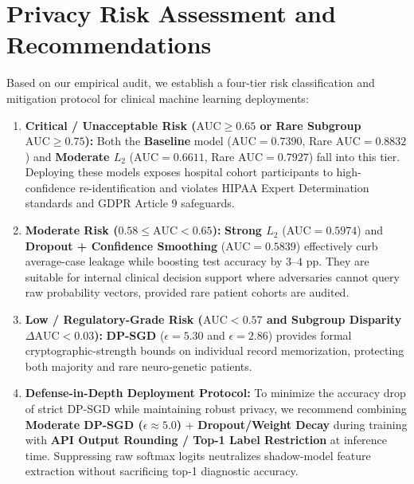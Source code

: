 \documentclass[10pt,twocolumn]{article}
\begin{document}
\section{Privacy Risk Assessment and Recommendations}
Based on our empirical audit, we establish a four-tier risk classification and mitigation protocol for clinical machine learning deployments:
\begin{enumerate}
    \item \textbf{Critical / Unacceptable Risk ($\text{AUC} \ge 0.65$ or Rare Subgroup $\text{AUC} \ge 0.75$):} Both the \textbf{Baseline} model ($\text{AUC}=0.7390$, Rare $\text{AUC}=0.8832$) and \textbf{Moderate $L_2$} ($\text{AUC}=0.6611$, Rare $\text{AUC}=0.7927$) fall into this tier. Deploying these models exposes hospital cohort participants to high-confidence re-identification and violates HIPAA Expert Determination standards and GDPR Article 9 safeguards.
    \item \textbf{Moderate Risk ($0.58 \le \text{AUC} < 0.65$):} \textbf{Strong $L_2$} ($\text{AUC}=0.5974$) and \textbf{Dropout + Confidence Smoothing} ($\text{AUC}=0.5839$) effectively curb average-case leakage while boosting test accuracy by $3$--$4$ pp. They are suitable for internal clinical decision support where adversaries cannot query raw probability vectors, provided rare patient cohorts are audited.
    \item \textbf{Low / Regulatory-Grade Risk ($\text{AUC} < 0.57$ and Subgroup Disparity $\Delta\text{AUC} < 0.03$):} \textbf{DP-SGD} ($\epsilon=5.30$ and $\epsilon=2.86$) provides formal cryptographic-strength bounds on individual record memorization, protecting both majority and rare neuro-genetic patients.
    \item \textbf{Defense-in-Depth Deployment Protocol:} To minimize the accuracy drop of strict DP-SGD while maintaining robust privacy, we recommend combining \textbf{Moderate DP-SGD ($\epsilon \approx 5.0$)} + \textbf{Dropout/Weight Decay} during training with \textbf{API Output Rounding / Top-1 Label Restriction} at inference time. Suppressing raw softmax logits neutralizes shadow-model feature extraction without sacrificing top-1 diagnostic accuracy.
\end{enumerate}
\end{document}
